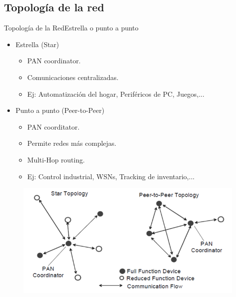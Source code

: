 \documentclass[aspectratio=169]{beamer}
\begin{document}
\subsection[Topología]{Topología de la red}

\begin{frame}{Topología de la Red}{Estrella o punto a punto}

\begin{minipage}[c]{1.0\linewidth}
	\begin{minipage}[c]{0.45\linewidth}
		\begin{itemize}
			\item Estrella (Star)
			\begin{itemize}
				\item PAN coordinator.
				\item Comunicaciones centralizadas.
				\item Ej: Automatización del hogar, Periféricos de PC, Juegos,...
					\end{itemize}
			\vspace{10px}
			\item Punto a punto (Peer-to-Peer)
			\begin{itemize}
				\item PAN coorditator.
				\item Permite redes más complejas.
				\item Multi-Hop routing.
				\item Ej: Control industrial,  WSNs, Tracking de inventario,...
			\end{itemize}
	  	\end{itemize}	
	\end{minipage}
	\hspace{-20px}
	\begin{minipage}[c]{0.7\linewidth}
		\begin{figure}[H]
			{\includegraphics[width=.7\textwidth]{./imagenes/Topology}}
		\end{figure}	  	  	
	\end{minipage}
\end{minipage}
\end{frame}
\end{document}
